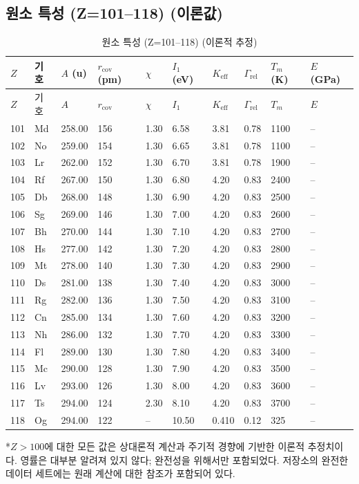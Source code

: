 \documentclass[12pt,a4paper]{article}
\newcommand{\Keff}{K_{\mathrm{eff}}}
\begin{document}
	\subsection*{원소 특성 (Z=101–118) (이론값)}
	
	\begin{longtable}{p{0.6cm}p{1.2cm}p{1.2cm}p{1.2cm}p{1.2cm}p{1.2cm}p{1.5cm}p{1.2cm}p{1.2cm}p{1.2cm}}
		\caption{원소 특성 (Z=101–118) (이론적 추정)} \label{tab:elem-data-101to118} \\
		\toprule
		\(Z\) & 기호 & \(A\) (u) & \(r_{\text{cov}}\) (pm) & \(\chi\) & \(I_1\) (eV) & \(\Keff\) & \(\Gamma_{\text{rel}}\) & \(T_m\) (K) & \(E\) (GPa) \\
		\midrule
		\endfirsthead
		\toprule
		\(Z\) & 기호 & \(A\) & \(r_{\text{cov}}\) & \(\chi\) & \(I_1\) & \(\Keff\) & \(\Gamma_{\text{rel}}\) & \(T_m\) & \(E\) \\
		\midrule
		\endhead
		101 & Md & 258.00 & 156 & 1.30 & 6.58 & 3.81 & 0.78 & 1100 & – \\
		102 & No & 259.00 & 154 & 1.30 & 6.65 & 3.81 & 0.78 & 1100 & – \\
		103 & Lr & 262.00 & 152 & 1.30 & 6.70 & 3.81 & 0.78 & 1900 & – \\
		104 & Rf & 267.00 & 150 & 1.30 & 6.80 & 4.20 & 0.83 & 2400 & – \\
		105 & Db & 268.00 & 148 & 1.30 & 6.90 & 4.20 & 0.83 & 2500 & – \\
		106 & Sg & 269.00 & 146 & 1.30 & 7.00 & 4.20 & 0.83 & 2600 & – \\
		107 & Bh & 270.00 & 144 & 1.30 & 7.10 & 4.20 & 0.83 & 2700 & – \\
		108 & Hs & 277.00 & 142 & 1.30 & 7.20 & 4.20 & 0.83 & 2800 & – \\
		109 & Mt & 278.00 & 140 & 1.30 & 7.30 & 4.20 & 0.83 & 2900 & – \\
		110 & Ds & 281.00 & 138 & 1.30 & 7.40 & 4.20 & 0.83 & 3000 & – \\
		111 & Rg & 282.00 & 136 & 1.30 & 7.50 & 4.20 & 0.83 & 3100 & – \\
		112 & Cn & 285.00 & 134 & 1.30 & 7.60 & 4.20 & 0.83 & 3200 & – \\
		113 & Nh & 286.00 & 132 & 1.30 & 7.70 & 4.20 & 0.83 & 3300 & – \\
		114 & Fl & 289.00 & 130 & 1.30 & 7.80 & 4.20 & 0.83 & 3400 & – \\
		115 & Mc & 290.00 & 128 & 1.30 & 7.90 & 4.20 & 0.83 & 3500 & – \\
		116 & Lv & 293.00 & 126 & 1.30 & 8.00 & 4.20 & 0.83 & 3600 & – \\
		117 & Ts & 294.00 & 124 & 2.30 & 8.10 & 4.20 & 0.83 & 3700 & – \\
		118 & Og & 294.00 & 122 & –    & 10.50 & 0.410 & 0.12 & 325 & – \\
		\bottomrule
	\end{longtable}
	*\(Z>100\)에 대한 모든 값은 상대론적 계산과 주기적 경향에 기반한 이론적 추정치이다. 영률은 대부분 알려져 있지 않다; 완전성을 위해서만 포함되었다. 저장소의 완전한 데이터 세트에는 원래 계산에 대한 참조가 포함되어 있다.
	
\end{document}
